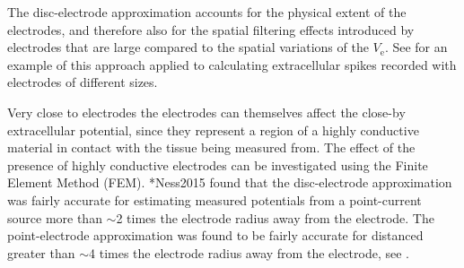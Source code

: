 The disc-electrode approximation accounts for the physical extent of the electrodes, 
and therefore also for the spatial filtering effects introduced by electrodes that are large 
compared to the spatial variations of the $V_\mathrm{e}$. 
See  for an example of this approach applied to calculating extracellular 
spikes recorded with electrodes of different sizes.


Very close to electrodes the electrodes can themselves affect the close-by extracellular potential, 
since they represent a region of a highly conductive material in contact with the tissue being measured from.
The effect of the presence of highly conductive electrodes can be investigated using the Finite Element Method (FEM). \citeasnoun**{Ness2015} found that the disc-electrode approximation was fairly accurate for estimating measured potentials from a point-current source more than $\sim$2 times the electrode radius away from the electrode. The point-electrode approximation was found to be fairly accurate for distanced greater than $\sim$4 times the electrode radius away from the electrode, see .

